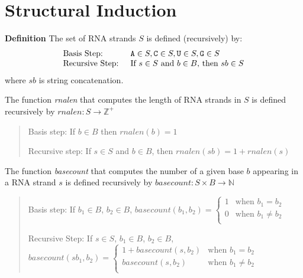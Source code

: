 \documentclass[12pt, oneside]{article}
\begin{document}


\section*{Structural Induction}
{\bf Definition} The set of RNA strands $S$ is defined (recursively) by:
\[
\begin{array}{ll}
\textrm{Basis Step: } & \texttt{A} \in S, \texttt{C} \in S, \texttt{U} \in S, \texttt{G} \in S \\
\textrm{Recursive Step: } & \textrm{If } s \in S\textrm{ and }b \in B \textrm{, then }sb \in S
\end{array}
\]
where $sb$ is string concatenation.

The function \textit{rnalen} that computes the length of RNA strands in $S$ is defined recursively by
$rnalen: S  \to \mathbb{Z}^+$

\vspace{-20pt}

\begin{quote}
Basis step: If $b \in B$ then $rnalen(b)  = 1$

Recursive step: If $s \in S$ and $b \in B$, then $rnalen(sb)  = 1 + rnalen(s)$
\end{quote}

\vspace{-20pt}

The function \textit{basecount} that computes the number of a given base $b$ appearing in a RNA strand $s$ is defined recursively by $basecount : S \times B \to\mathbb{N}$

\vspace{-20pt}

\begin{quote}
Basis step: If  $b_1 \in B$, $b_2 \in B$, $basecount(b_1, b_2) =
        \begin{cases}
            1 & \textrm{when } b_1 = b_2 \\
            0 & \textrm{when } b_1 \neq b_2 \\
        \end{cases}$

Recursive Step: If $s \in S$, $b_1 \in B$, $b_2 \in B$, $basecount(s b_1, b_2) =
        \begin{cases}
            1 + \textit{basecount}(s, b_2) & \textrm{when } b_1 = b_2 \\
            \textit{basecount}(s, b_2) & \textrm{when } b_1 \neq b_2 \\
        \end{cases}$
\end{quote}
\end{document}
